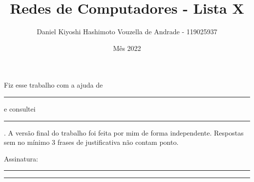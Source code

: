 \documentclass{article}
\title{Redes de Computadores - Lista X}
\author{Daniel Kiyoshi Hashimoto Vouzella de Andrade - 119025937}
\date{Mês 2022}
\newcommand{\blank}{\rule[0pt]{5em}{.3pt}}
\newcommand{\preamble}[2]{\noindent%
    Fiz esse trabalho com a ajuda de {\bfseries #1}
    e consultei {\bfseries #2}.
    A versão final do trabalho foi feita
    por mim de forma independente.
    Respostas sem no mínimo 3 frases de justificativa
    não contam ponto.
    \par\noindent Assinatura: \blank\blank\bigskip}
\begin{document}
\maketitle

\preamble{\blank}{\blank}
\end{document}
